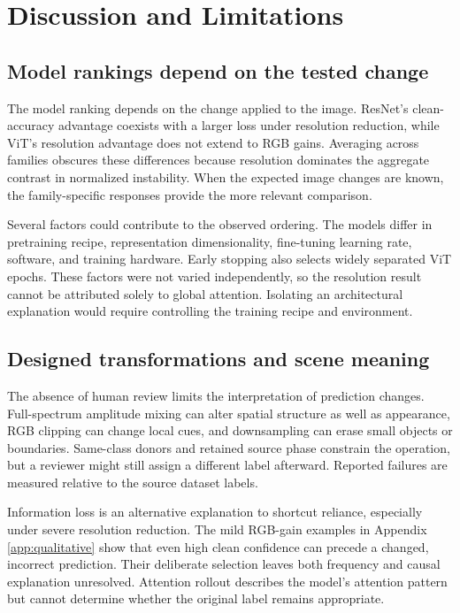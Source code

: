 \section{Discussion and Limitations}\label{sec:discussion}

\subsection{Model rankings depend on the tested change}

The model ranking depends on the change applied to the image. ResNet's clean-accuracy advantage coexists with a larger loss under resolution reduction, while ViT's resolution advantage does not extend to RGB gains. Averaging across families obscures these differences because resolution dominates the aggregate contrast in normalized instability. When the expected image changes are known, the family-specific responses provide the more relevant comparison.

Several factors could contribute to the observed ordering. The models differ in pretraining recipe, representation dimensionality, fine-tuning learning rate, software, and training hardware. Early stopping also selects widely separated ViT epochs. These factors were not varied independently, so the resolution result cannot be attributed solely to global attention. Isolating an architectural explanation would require controlling the training recipe and environment.

\subsection{Designed transformations and scene meaning}

The absence of human review limits the interpretation of prediction changes. Full-spectrum amplitude mixing can alter spatial structure as well as appearance, RGB clipping can change local cues, and downsampling can erase small objects or boundaries. Same-class donors and retained source phase constrain the operation, but a reviewer might still assign a different label afterward. Reported failures are measured relative to the source dataset labels.

Information loss is an alternative explanation to shortcut reliance, especially under severe resolution reduction. The mild RGB-gain examples in Appendix \ref{app:qualitative} show that even high clean confidence can precede a changed, incorrect prediction. Their deliberate selection leaves both frequency and causal explanation unresolved. Attention rollout describes the model's attention pattern but cannot determine whether the original label remains appropriate.


